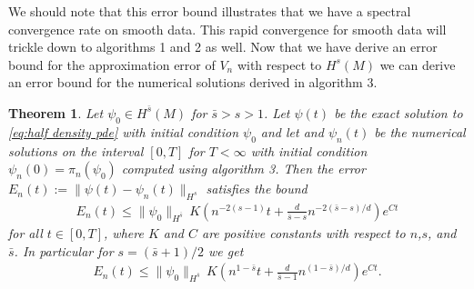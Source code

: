 \documentclass[12pt]{amsart}
\newtheorem{thm}{Theorem}[section]
\begin{document}
We should note that this error bound illustrates that we have a spectral convergence rate on smooth data.
This rapid convergence for smooth data will trickle down to algorithms 1 and 2 as well.
Now that we have derive an error bound for the approximation error of $V_{n}$ with respect to $H^{s}(M)$ we can 
derive an error bound for the numerical solutions derived in algorithm 3.

\begin{thm} \label{thm:half density convergence}
	Let $\psi_{0} \in H^{\bar{s}}(M)$ for $\bar{s} > s > 1$.
	Let $\psi(t)$ be the exact solution to \eqref{eq:half density pde} with initial condition $\psi_{0}$ and let
	and $\psi_{n}(t)$ be the numerical solutions on the interval $[0,T]$ for $T < \infty$ with initial condition $\psi_{n}(0) = \pi_{n}(\psi_{0})$
	computed using algorithm 3.
	Then the error $E_{n}(t) := \| \psi(t) - \psi_{n}(t) \|_{H^{s}}$ satisfies the bound
	\begin{align*}
		E_{n}(t) \leq \| \psi_{0} \|_{H^{\bar{s}}} \, K \left( n^{-2(s-1)} t+  \frac{d}{\bar{s}-s} n^{-2(\bar{s}-s)/d} \right) e^{C t}
	\end{align*}
	for all $t \in [0,T]$, where $K$ and $C$ are positive constants with respect to $n$,$s$, and $\bar{s}$.
	In particular for $s = (\bar{s}+1)/2$ we get
	\begin{align*}
			E_{n}(t) \leq \| \psi_{0} \|_{H^{\bar{s}}} \, K \left( n^{1-\bar{s}} t+  \frac{d}{\bar{s}-1} n^{(1-\bar{s})/d} \right) e^{C t}.
	\end{align*}
\end{thm}
\end{document}
